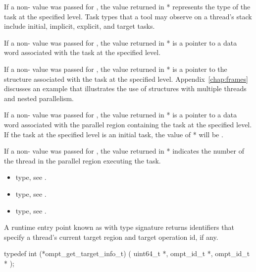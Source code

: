 If a non- value was passed for ,
the value returned in * represents the type of the task
at the specified level.
Task types that a tool may observe on a thread's stack include
initial, implicit, explicit, and target tasks.

If a non- value was passed for ,
the value returned in * is a pointer to a data word
associated with the task at the specified level.

If a non- value was passed for ,
the value returned in * is a pointer to the
 structure associated with the task at the specified level.
Appendix~\ref{chap:frames} discusses an example that
illustrates the use of  structures with multiple
threads and nested parallelism.

If a non- value was passed for ,
the value returned in * is a pointer to a data word
associated with the parallel region containing the task at the specified level.
If the task at the specified level is an initial task,
the value of * will be .

If a non- value was passed for ,
the value returned in *
indicates the number of the thread in the parallel region executing the task.

\crossreferences
\begin{itemize}
\item {} type, see .
\item {} type, see .
\item {} type, see
  .
\end{itemize}

\label{sec:ompt_get_target_info_t}
\label{sec:ompt_get_target_info}

\summary
A runtime entry point known as 
with type signature  returns identifiers that specify a
thread's current target region and target operation id, if any.

\format
\begin{ccppspecific}
\begin{omptInquiry}
typedef int (*ompt_get_target_info_t) (
  uint64_t *,
  ompt_id_t *,
  ompt_id_t *
);
\end{omptInquiry}
\end{ccppspecific}


